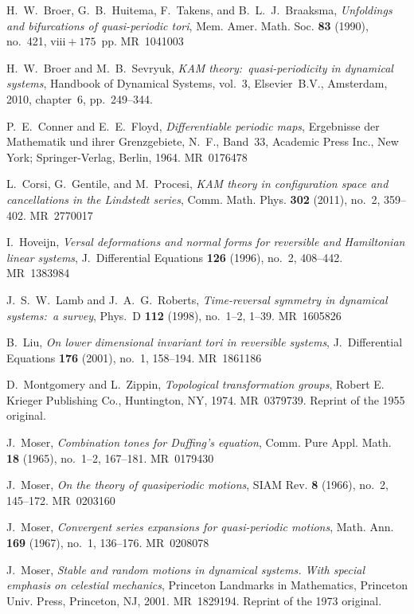 \documentclass[12pt,reqno]{amsart}
\theoremstyle{definition}
\begin{document}
\begin{thebibliography}{99}
H.~W.~Broer, G.~B.~Huitema, F.~Takens, and B.~L.~J.~Braaksma, \emph{Unfoldings
and bifurcations of quasi-periodic tori}, Mem. Amer. Math. Soc. \textbf{83}
(1990), no.~421, $\text{viii}+175$~pp. MR~1041003

H.~W.~Broer and M.~B.~Sevryuk, \emph{KAM theory:\ quasi-periodicity in
dynamical systems}, Handbook of Dynamical Systems, vol.~3, Elsevier~B.V.,
Amsterdam, 2010, chapter~6, pp.~249--344.

P.~E.~Conner and E.~E.~Floyd, \emph{Differentiable periodic
maps}, Ergebnisse der Mathematik und ihrer Grenzgebiete, N.~F., Band~33,
Academic Press Inc., New York; Springer-Verlag, Berlin, 1964. MR~0176478

L.~Corsi, G.~Gentile, and M.~Procesi, \emph{KAM theory in configuration space
and cancellations in the Lindstedt series}, Comm. Math. Phys. \textbf{302}
(2011), no.~2, 359--402. MR~2770017

I.~Hoveijn, \emph{Versal deformations and normal forms for reversible and
Hamiltonian linear systems}, J.~Differential Equations \textbf{126} (1996),
no.~2, 408--442. MR~1383984

J.~S.~W.~Lamb and J.~A.~G.~Roberts, \emph{Time-reversal symmetry in dynamical
systems:\ a survey}, Phys.~D \textbf{112} (1998), no.~1--2, 1--39. MR~1605826

B.~Liu, \emph{On lower dimensional invariant tori in reversible systems},
J.~Differential Equations \textbf{176} (2001), no.~1, 158--194. MR~1861186

D.~Montgomery and L.~Zippin, \emph{Topological transformation groups},
Robert E. Krieger Publishing Co., Huntington, NY, 1974. MR~0379739. Reprint
of the 1955 original.

J.~Moser, \emph{Combination tones for Duffing's equation}, Comm. Pure Appl.
Math. \textbf{18} (1965), no.~1--2, 167--181. MR~0179430

J.~Moser, \emph{On the theory of quasiperiodic motions}, SIAM Rev. \textbf{8}
(1966), no.~2, 145--172. MR~0203160

J.~Moser, \emph{Convergent series expansions for quasi-periodic motions},
Math. Ann. \textbf{169} (1967), no.~1, 136--176. MR~0208078

J.~Moser, \emph{Stable and random motions in dynamical systems. With special
emphasis on celestial mechanics}, Princeton Landmarks in Mathematics,
Princeton Univ. Press, Princeton, NJ, 2001. MR~1829194. Reprint of the 1973
original.


\end{thebibliography}
\end{document}
